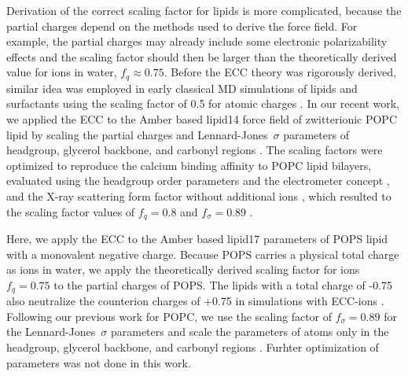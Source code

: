 \documentclass[journal=jpcbfk,manuscript=article]{achemso}
\begin{document}
Derivation of the correct scaling factor for lipids is more complicated, because
the partial charges depend on the methods used to derive the force field.
For example, the partial charges may already include some electronic polarizability effects
and the scaling factor should then be larger than the theoretically derived value for ions in water, $f_q \approx 0.75$.
Before the ECC theory was rigorously derived, similar idea was employed in early classical 
MD simulations of lipids and surfactants using the scaling factor of 0.5 for atomic charges  \cite{jonsson86,egberts94, berendsen1996}. 
In our recent work, we applied the ECC to the Amber based lipid14 force field of zwitterionic POPC lipid \cite{dickson14}
by scaling the partial charges and Lennard-Jones~$\sigma$ parameters of headgroup, glycerol backbone,
and carbonyl regions \cite{melcr18}. The scaling factors were optimized to reproduce 
the calcium binding affinity to POPC lipid bilayers, evaluated using the headgroup order parameters
and the electrometer concept \cite{akutsu81,altenbach84,seelig87,catte16}, and the X-ray scattering form factor
without additional ions \cite{kucerka11}, which resulted to the scaling factor values of $f_q = 0.8$ and $f_\sigma = 0.89$  \cite{melcr18}.

Here, we apply the ECC to the Amber based lipid17 parameters \cite{lipid17-future} of POPS lipid with a monovalent negative charge.
Because POPS carries a physical total charge as ions in water, we apply the theoretically derived scaling factor for
ions $f_q = 0.75$ \cite{leontyev09} to the partial charges of POPS. The lipids with a total charge of -0.75 also neutralize
the counterion charges of +0.75 in simulations with ECC-ions \cite{kohagen16}.
Following our previous work for POPC, we use the scaling factor of $f_\sigma = 0.89$ for the Lennard-Jones~$\sigma$ parameters and
scale the parameters of atoms only in the headgroup, glycerol backbone, and carbonyl regions \cite{melcr18}.
Furhter optimization of parameters was not done in this work.


\end{document}
